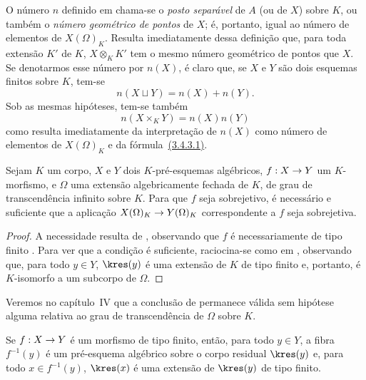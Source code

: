 \documentclass[oneside]{amsart}
\makeatletter
\newcommand{\ega@arrow}[2]{\mathchoice{#1}{#2}{#2}{#2}}
\renewcommand{\to}{\ega@arrow{\longrightarrow}{\rightarrow}}
\let\EGAOriginalLabel\label
\renewcommand{\label}[1]{\phantomsection\EGAOriginalLabel{#1}}
\makeatother
\begin{document}
\begin{env}[6.4.8]
\label{I.6.4.8}
O número $n$ definido em  chama-se o \emph{posto separável} de $A$ (ou de $X$) sobre $K$, ou também o \emph{número geométrico de pontos} de $X$;
é, portanto, igual ao número de elementos de $X(\Omega)_K$.
Resulta imediatamente dessa definição que, para toda extensão $K'$ de $K$, $X\otimes_K K'$ tem o mesmo número geométrico de pontos que $X$.
Se denotarmos esse número por $n(X)$, é claro que, se $X$ e $Y$ são dois esquemas finitos sobre $K$, tem-se
\[
  n(X\sqcup Y)=n(X)+n(Y).
  \tag{6.4.8.1}
\]
Sob as mesmas hipóteses, tem-se também
\[
  n(X\times_K Y)=n(X)n(Y)
  \tag{6.4.8.2}
\]
como resulta imediatamente da interpretação de $n(X)$ como número de elementos de $X(\Omega)_K$ e da fórmula~\hyperref[I.3.4.3.1]{(3.4.3.1)}.
\end{env}

\begin{proposition}[6.4.9]
\label{I.6.4.9}
Sejam $K$ um corpo, $X$ e $Y$ dois $K$-pré-esquemas algébricos, $f:X\to Y$ um $K$-morfismo, e $\Omega$ uma extensão algebricamente fechada de $K$, de grau de transcendência infinito sobre $K$.
Para que $f$ seja sobrejetivo, é necessário e suficiente que a aplicação $X(\Omega)_K\to Y(\Omega)_K$ correspondente a $f$  seja sobrejetiva.
\end{proposition}

\begin{proof}
A necessidade resulta de , observando que $f$ é necessariamente de tipo finito .
Para ver que a condição é suficiente, raciocina-se como em , observando que, para todo $y\in Y$, $\kres(y)$ é uma extensão de $K$ de tipo finito e, portanto, é $K$-isomorfo a um subcorpo de $\Omega$.
\end{proof}

\begin{remark}[6.4.10]
\label{I.6.4.10}
Veremos no capítulo~IV que a conclusão de  permanece válida sem hipótese alguma relativa ao grau de transcendência de $\Omega$ sobre $K$.
\end{remark}

\begin{proposition}[6.4.11]
\label{I.6.4.11}
Se $f:X\to Y$ é um morfismo de tipo finito, então, para todo $y\in Y$, a fibra $f^{-1}(y)$ é um pré-esquema algébrico sobre o corpo residual $\kres(y)$ e, para todo $x\in f^{-1}(y)$, $\kres(x)$ é uma extensão de $\kres(y)$ de tipo finito.
\end{proposition}
\end{document}
